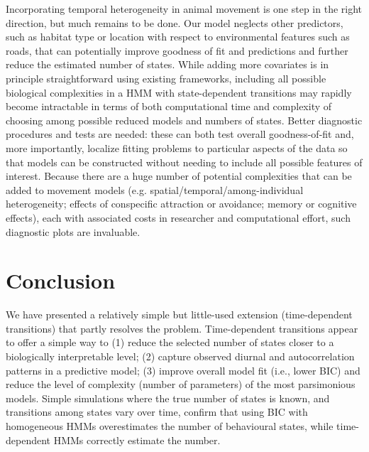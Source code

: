\documentclass{bmcart}
\begin{document}
Incorporating temporal heterogeneity in animal movement is one step in
the right direction, but much remains to be done. 
Our model neglects other predictors, such as habitat type or
location with respect to environmental features such as roads,
that can potentially improve goodness of fit and predictions and 
further reduce the estimated number of states. While adding
more covariates is in principle straightforward using existing
frameworks, including all possible biological complexities in 
a HMM with state-dependent transitions may rapidly become intractable
in terms of both computational time and complexity of choosing
among possible reduced models and numbers of states.
Better diagnostic procedures and tests are needed:
these can both test overall goodness-of-fit \cite{potts_generalized_2014} 
and, more importantly, localize fitting problems to particular aspects of the
data so that models can be constructed without needing to
include all possible features of interest. Because there are a huge number of potential complexities that can be added to movement models (e.g. spatial/temporal/among-individual heterogeneity; effects of conspecific attraction or avoidance; memory or cognitive effects), each with associated costs in researcher and computational effort, such diagnostic plots are invaluable.


\section*{Conclusion}

We have presented a relatively simple but little-used extension
(time-dependent transitions) that partly resolves the problem.
Time-dependent transitions appear to offer a simple way to (1) reduce
the selected number of states closer to a biologically interpretable
level; (2) capture observed diurnal and autocorrelation patterns in a
predictive model; (3) improve overall model fit (i.e., lower BIC) and
reduce the level of complexity (number of parameters) of the most
parsimonious models. Simple simulations where the true number of
states is known, and transitions among states vary over time, confirm
that using BIC with homogeneous HMMs overestimates the number of
behavioural states, while time-dependent HMMs correctly estimate
the number.



\end{document}
